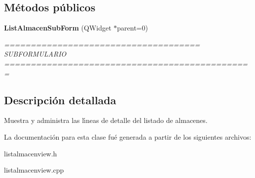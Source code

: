 \subsection*{M\'{e}todos p\'{u}blicos}
\begin{CompactItemize}
\item 
{\bf List\-Almacen\-Sub\-Form} (QWidget $\ast$parent=0)\label{classListAlmacenSubForm_a0}

\begin{CompactList}\small\item\em ===================================== SUBFORMULARIO =============================================== \item\end{CompactList}\end{CompactItemize}


\subsection{Descripci\'{o}n detallada}
Muestra y administra las l\'{\i}neas de detalle del listado de almacenes. 



La documentaci\'{o}n para esta clase fu\'{e} generada a partir de los siguientes archivos:\begin{CompactItemize}
\item 
listalmacenview.h\item 
listalmacenview.cpp\end{CompactItemize}
